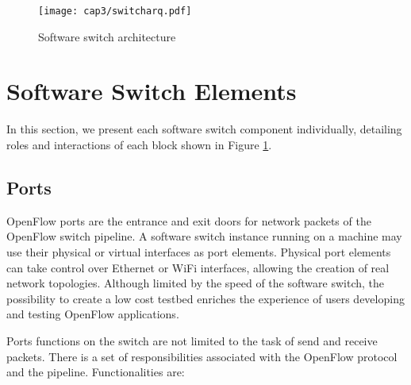 \begin{figure}[h!]
\centering
\texttt{[image: cap3/switcharq.pdf]}
\caption{Software switch architecture}
\label{fig:switcharq}
\end{figure}

\section{Software Switch Elements}

In this section, we present each software switch component individually, detailing roles and interactions of each block shown in Figure \ref{fig:switcharq}.     	

	\subsection{Ports}

	OpenFlow ports are the entrance and exit doors for  network packets of the OpenFlow switch pipeline. A software switch instance running on a machine may use their physical or virtual interfaces as port elements. Physical port elements can take control over Ethernet or WiFi interfaces, allowing the creation of real network topologies. Although limited by the speed of the software switch, the possibility to create a low cost testbed enriches the experience of users developing and testing OpenFlow applications.     

	Ports functions on the switch are not limited to the task of send and receive packets. There is a set of responsibilities associated with the OpenFlow protocol and the pipeline. Functionalities are:

